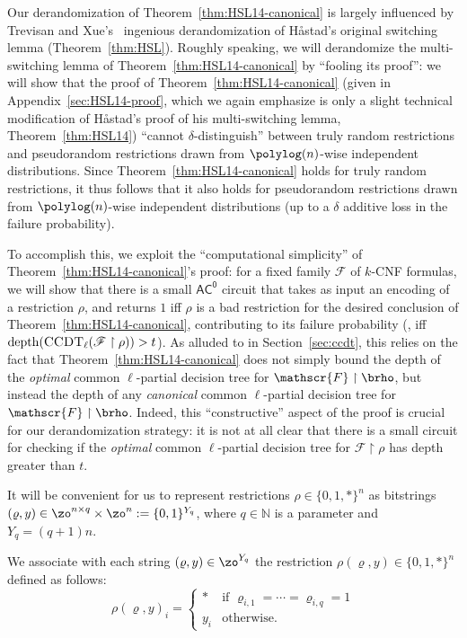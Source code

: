 \documentclass{toc}
\theoremstyle{plain}
\newcommand{\acz}{\mathsf{AC^0}}
\newcommand{\uhr}{\upharpoonright}
\newcommand{\CCDT}{\textsc{CCDT}}
\newcommand{\depth}{\mathrm{depth}}
\renewcommand{\N}{\mathds{N}}
\begin{document}
Our derandomization of Theorem~\ref{thm:HSL14-canonical} is largely influenced by Trevisan and Xue's~\cite{TX13} ingenious derandomization of H{\aa}stad's original switching lemma (Theorem~\ref{thm:HSL}).  Roughly speaking, we will derandomize the multi-switching lemma of Theorem~\ref{thm:HSL14-canonical} by ``fooling its proof'':  we will show that the proof of Theorem~\ref{thm:HSL14-canonical} (given in Appendix~\ref{sec:HSL14-proof}, which we again emphasize is only a slight technical modification of H{\aa}stad's proof of his multi-switching lemma, Theorem~\ref{thm:HSL14}) ``cannot $\delta$-distinguish'' between truly random restrictions and pseudorandom restrictions drawn from $\polylog(n)$-wise independent distributions.  Since Theorem~\ref{thm:HSL14-canonical} holds for truly random restrictions, it thus follows that it also holds for pseudorandom restrictions drawn from $\polylog(n)$-wise independent distributions (up to a $\delta$ additive loss in the failure probability). 

To accomplish this, we exploit the ``computational simplicity'' of Theorem~\ref{thm:HSL14-canonical}'s proof: for a fixed family $\mathscr{F}$ of $k$-CNF formulas, we will show that there is a small $\acz$ circuit that takes as input an encoding of a restriction $\rho$, and returns $1$ iff $\rho$ is a bad restriction for the desired conclusion of Theorem~\ref{thm:HSL14-canonical}, contributing to its failure probability (\ie, iff $\depth(\CCDT_\ell(\mathscr{F} \uhr \rho)) > t$).   As alluded to in Section~\ref{sec:ccdt}, this relies on the fact that Theorem~\ref{thm:HSL14-canonical} does not simply bound the depth of the \emph{optimal} common $\ell$-partial decision tree for $\mathscr{F} \uhr \brho$, but instead the depth of any \emph{canonical} common $\ell$-partial decision tree for $\mathscr{F} \uhr \brho$. Indeed, this ``constructive'' aspect of the proof  is crucial for our derandomization strategy: it is not at all clear that there is a small circuit for checking if the \emph{optimal} common $\ell$-partial decision tree for $\mathscr{F} \uhr \rho$ has depth greater than $t$.

\medskip 

It will be convenient for us to represent restrictions $\rho \in \{0,1,\ast\}^n$ as bitstrings $(\varrho,y) \in \zo^{n\times q} \times \zo^n := \{0,1\}^{Y_q}$, where $q \in \N$ is a parameter and $Y_q = (q+1)n$.
%


\begin{definition} 
\label{def:string-to-restriction}
We associate with each string $(\varrho,y) \in \zo^{Y_q}$ the restriction $\rho(\varrho,y) \in \{0,1,\ast\}^{n}$ defined as follows: 
\[ 
\rho(\varrho,y)_i  = \begin{cases}
\ast & \text{if $\varrho_{i,1} = \cdots = \varrho_{i,q} = 1$} \\
y_i & \text{otherwise}. 
\end{cases}
\] 
\end{definition} 
\end{document}
